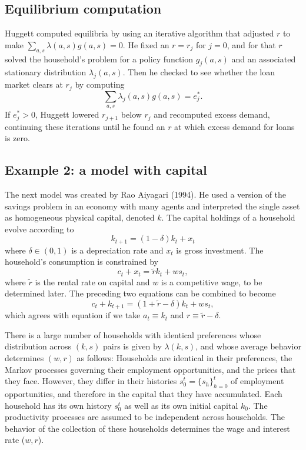 \subsection{Equilibrium computation}
 Huggett computed  equilibria by using an iterative  algorithm that adjusted
 $r$ to make $\sum_{a,s} \lambda(a,s) g(a,s) = 0$.
 He fixed an
$r=r_j$ for $j=0$, and for that $r$ solved the household's problem
for a policy function $g_j(a,s)$ and an associated stationary
distribution $\lambda_j(a,s)$. Then he checked to see
whether the loan market clears at $r_j$ by computing
$$ \sum_{a,s} \lambda_j(a,s) g(a,s) = e_j^*.$$
If $e_j^* >0$, Huggett lowered $r_{j+1}$ below $r_j$ and
recomputed excess demand, continuing these iterations until he
found an $r$ at which excess demand for loans is zero.



\subsection{Example 2: a model with capital}
 The next model
was created by Rao Aiyagari (1994).   He used
a version of the savings problem in an economy with
many agents  and interpreted the single asset
as homogeneous physical capital, denoted $k$.
The capital holdings of a household evolve
according to
$$ k_{t+1} = (1-\delta) k_t + x_t $$
where $\delta \in (0,1)$ is a depreciation rate  and
$x_t$ is gross investment.  The household's consumption
is constrained by
$$ c_t + x_t = \tilde r k_t + w s_t,$$
where $\tilde r$ is the rental rate on capital and $w$ is
a competitive wage, to be determined later.  The
preceding two equations can be combined to become
$$ c_t + k_{t+1} = (1+\tilde r - \delta ) k_t + w s_t, $$
which agrees with equation  if we take $a_t \equiv k_t$
and $r \equiv \tilde r - \delta $.

There is a large number of households with identical preferences
 whose
distribution across $(k,s)$ pairs is given by $\lambda(k,s)$,
and whose average behavior determines $(w,r)$ as follows:
%
Households are identical in their preferences,
the Markov processes governing their employment opportunities,
and the prices that they face. However, they differ in their
histories $s^t_0 = \{s_h\}_{h=0}^t$ of employment opportunities,
 and therefore in the capital that they have
accumulated. Each household has its own history $s^t_0$ as well
as its own  initial capital $k_0$. The
productivity processes are assumed to be independent across
households. The behavior of the collection of these households
determines the wage and interest rate ($w,r$).

